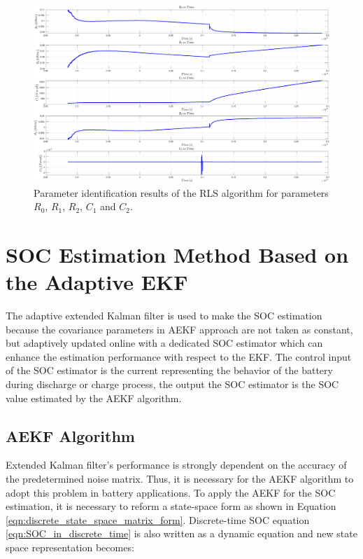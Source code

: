 \documentclass[12pt]{article}
\begin{document}
\begin{figure}[t!]
	\centering
	\includegraphics[width=\textwidth, keepaspectratio]{images/RLS_Results.pdf}
	\caption{Parameter identification results of the RLS algorithm for parameters $R_{0}$, $R_{1}$, $R_{2}$, $C_{1}$ and $C_{2}$.}
	\label{fig:Results_of_the_RLS_Method}
\end{figure}

\section{SOC Estimation Method Based on the Adaptive EKF \cite{Pang2018}} 
\label{SOC_Estimation_Based_on_the_Adaptive_EKF}

The adaptive extended Kalman filter is used to make the SOC estimation because the covariance
 parameters in AEKF approach are not taken as constant, but adaptively updated online with
a dedicated SOC estimator which can enhance the estimation performance with respect
to the EKF. The control input of the SOC estimator is the current representing the behavior of the battery during discharge or charge process, the output the SOC
estimator is the SOC value estimated by the AEKF algorithm.

\subsection{AEKF Algorithm}
\label{Adaptive_EKF}

Extended Kalman filter's performance is strongly dependent on the accuracy of the predetermined noise matrix. Thus, it is necessary for the AEKF algorithm to adopt this problem in battery applications. To apply the AEKF for the SOC estimation, it is necessary to reform a state-space form as shown in Equation \ref{eqn:discrete_state_space_matrix_form}. Discrete-time SOC equation \ref{eqn:SOC_in_discrete_time} is also written as a dynamic equation and new state space representation becomes: 
\end{document}

